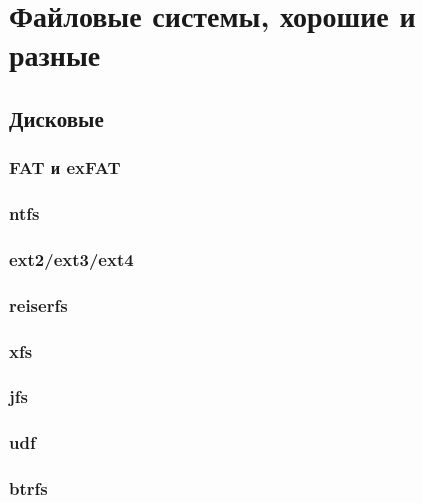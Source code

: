 \chapter{Файловые системы, хорошие и разные}
\section{Дисковые}
\subsection{FAT и exFAT}
\subsection{ntfs}
\subsection{ext2/ext3/ext4}
\subsection{reiserfs}
\subsection{xfs}
\subsection{jfs}
\subsection{udf}
\subsection{btrfs}
